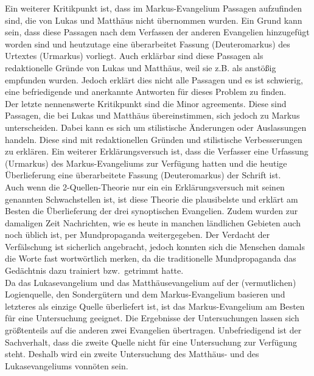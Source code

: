 Ein weiterer Kritikpunkt ist, dass im Markus-Evangelium Passagen aufzufinden sind, die von Lukas und Matthäus nicht übernommen wurden. Ein Grund kann sein, dass diese Passagen nach dem Verfassen der anderen Evangelien hinzugefügt worden sind und heutzutage eine überarbeitet Fassung (Deuteromarkus) des Urtextes (Urmarkus) vorliegt. Auch erklärbar sind diese Passagen als redaktionelle Gründe von Lukas und Matthäus, weil sie z.B. als anstößig empfunden wurden. Jedoch erklärt dies nicht alle Passagen und es ist schwierig, eine befriedigende und anerkannte Antworten für dieses Problem zu finden.\\

Der letzte nennenswerte Kritikpunkt sind die Minor agreements. Diese sind Passagen, die bei Lukas und Matthäus übereinstimmen, sich jedoch zu Markus unterscheiden. Dabei kann es sich um stilistische Änderungen oder Auslassungen handeln. Diese sind mit redaktionellen Gründen und stilistische Verbesserungen zu erklären. Ein weiterer Erklärungsversuch ist, dass  die Verfasser eine Urfassung (Urmarkus) des Markus-Evangeliums zur Verfügung hatten und die heutige Überlieferung eine überarbeitete Fassung (Deuteromarkus) der Schrift ist.\\

Auch wenn die 2-Quellen-Theorie nur ein ein Erklärungsversuch mit seinen genannten Schwachstellen ist, ist diese Theorie die plausibelste und erklärt am Besten die Überlieferung der drei synoptischen Evangelien. Zudem wurden zur damaligen Zeit Nachrichten, wie es heute in manchen ländlichen Gebieten auch noch üblich ist, per Mundpropaganda weitergegeben. Der Verdacht der Verfälschung ist sicherlich angebracht, jedoch konnten sich die Menschen damals die Worte fast wortwörtlich merken, da die traditionelle Mundpropaganda das Gedächtnis dazu trainiert bzw.\ getrimmt hatte.\\

Da das Lukasevangelium und das Matthäusevangelium auf der (vermutlichen) Logienquelle, den Sondergütern und dem Markus-Evangelium basieren und letzteres als einzige Quelle überliefert ist, ist das Markus-Evangelium am Besten für eine Untersuchung geeignet. Die Ergebnisse der Untersuchungen lassen sich größtenteils auf die anderen zwei Evangelien übertragen. Unbefriedigend ist der Sachverhalt, dass die zweite Quelle nicht für eine Untersuchung zur Verfügung steht. Deshalb wird ein zweite Untersuchung des Matthäus- und des Lukasevangeliums vonnöten sein.

